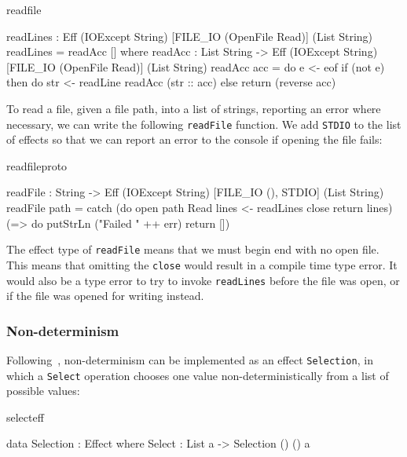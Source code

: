 \noindent
\begin{SaveVerbatim}{readfile}

 readLines : Eff (IOExcept String) 
                [FILE_IO (OpenFile Read)] (List String)
 readLines = readAcc [] where
   readAcc : List String -> 
             Eff (IOExcept String) 
                 [FILE_IO (OpenFile Read)] (List String)
   readAcc acc = do e <- eof
                    if (not e)
                       then do str <- readLine
                               readAcc (str :: acc)
                       else return (reverse acc)

\end{SaveVerbatim}

\noindent
To read a file, given a file path, into a list of strings, reporting an
error where necessary, we can write the following \texttt{readFile}
function. We add \texttt{STDIO} to the list of effects so that we can report
an error to the console if opening the file fails:

\noindent
\begin{SaveVerbatim}{readfileproto}

 readFile : String -> Eff (IOExcept String)
                [FILE_IO (), STDIO] (List String)
 readFile path = catch (do open path Read
                           lines <- readLines
                           close
                           return lines)
         (\err => do putStrLn ("Failed " ++ err)
                     return [])

\end{SaveVerbatim}

\noindent
The effect type of \texttt{readFile} means that we must begin  end
with no open file. This means that omitting the \texttt{close} would result in
a compile time type error. It would also be a type error to try to invoke
\texttt{readLines} before the file was open, or if the file was opened for
writing instead.

\subsubsection{Non-determinism}

Following~\cite{Bauer},
non-determinism can be implemented as an effect \texttt{Selection},
in which a \texttt{Select} operation chooses one value non-deterministically
from a list of possible values:

\begin{SaveVerbatim}{selecteff}

data Selection : Effect where
     Select : List a -> Selection () () a

\end{SaveVerbatim}

